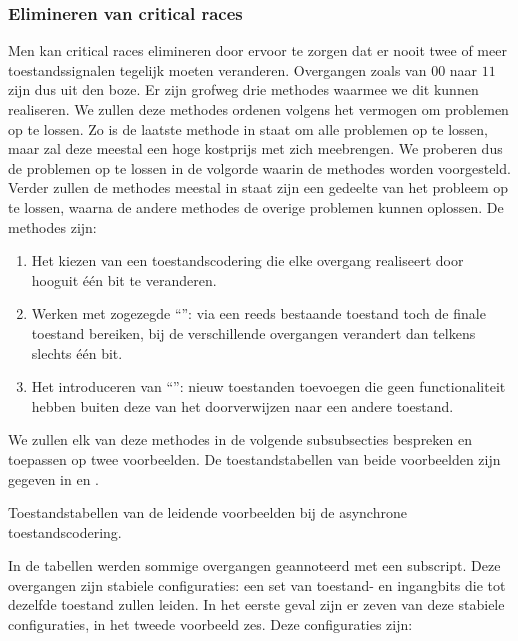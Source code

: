 \subsubsection{Elimineren van critical races}
Men kan critical races elimineren door ervoor te zorgen dat er nooit twee of meer toestandssignalen tegelijk moeten veranderen. Overgangen zoals van $00$ naar $11$ zijn dus uit den boze. Er zijn grofweg drie methodes waarmee we dit kunnen realiseren. We zullen deze methodes ordenen volgens het vermogen om problemen op te lossen. Zo is de laatste methode in staat om alle problemen op te lossen, maar zal deze meestal een hoge kostprijs met zich meebrengen. We proberen dus de problemen op te lossen in de volgorde waarin de methodes worden voorgesteld. Verder zullen de methodes meestal in staat zijn een gedeelte van het probleem op te lossen, waarna de andere methodes de overige problemen kunnen oplossen. De methodes zijn:
\begin{enumerate}
 \item Het kiezen van een toestandscodering die elke overgang realiseert door hooguit \'e\'en bit te veranderen.
 \item Werken met zogezegde ``'': via een reeds bestaande toestand toch de finale toestand bereiken, bij de verschillende overgangen verandert dan telkens slechts \'e\'en bit.
 \item Het introduceren van ``'': nieuw toestanden toevoegen die geen functionaliteit hebben buiten deze van het doorverwijzen naar een andere toestand.
\end{enumerate}
We zullen elk van deze methodes in de volgende subsubsecties bespreken en toepassen op twee voorbeelden. De toestandstabellen van beide voorbeelden zijn gegeven in  en .
\begin{table}[hbt]
\centering
{}
\caption{Toestandstabellen van de leidende voorbeelden bij de asynchrone toestandscodering.}
\end{table}
In de tabellen werden sommige overgangen geannoteerd met een subscript. Deze overgangen zijn stabiele configuraties: een set van toestand- en ingangbits die tot dezelfde toestand zullen leiden. In het eerste geval zijn er zeven van deze stabiele configuraties, in het tweede voorbeeld zes. Deze configuraties zijn:
